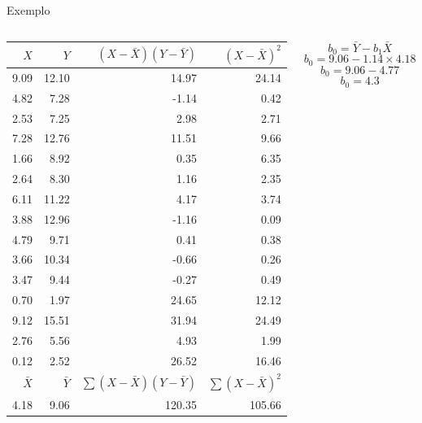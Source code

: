 \documentclass{beamer}\usepackage[]{graphicx}\usepackage[]{color}
\begin{document}
\begin{frame}{Exemplo}

\begin{columns}[c]


\begin{tiny}
\begin{table}[ht]
\centering
\begin{tabular}{rrrr}
  \hline
  $X$ & $Y$ & $(X - \bar X)(Y - \bar Y)$ & $(X - \bar X)^2$ \\ 
  \hline
  9.09 & 12.10 & 14.97 & 24.14 \\ 
  4.82 & 7.28 & -1.14 & 0.42 \\ 
  2.53 & 7.25 & 2.98 & 2.71 \\ 
  7.28 & 12.76 & 11.51 & 9.66 \\ 
  1.66 & 8.92 & 0.35 & 6.35 \\ 
  2.64 & 8.30 & 1.16 & 2.35 \\ 
  6.11 & 11.22 & 4.17 & 3.74 \\ 
  3.88 & 12.96 & -1.16 & 0.09 \\ 
  4.79 & 9.71 & 0.41 & 0.38 \\ 
  3.66 & 10.34 & -0.66 & 0.26 \\ 
  3.47 & 9.44 & -0.27 & 0.49 \\ 
  0.70 & 1.97 & 24.65 & 12.12 \\ 
  9.12 & 15.51 & 31.94 & 24.49 \\ 
  2.76 & 5.56 & 4.93 & 1.99 \\ 
  0.12 & 2.52 & 26.52 & 16.46 \\ 
   \hline
  $\bar X$ & $\bar Y$ & $\sum(X - \bar X)(Y - \bar Y)$ & $\sum(X - \bar X)^2$\\
  \hline
  4.18 & 9.06 & 120.35 &  105.66 \\
  \hline
\end{tabular}
\end{table}
\end{tiny}


\begin{equation*}
b_0 = \bar Y - b_1 \bar X
\end{equation*} \pause
\vfill
\begin{equation*}
b_0 = 9.06 - 1.14 \times 4.18
\end{equation*}  \pause
\vfill
\begin{equation*}
b_0 = 9.06 - 4.77
\end{equation*}  \pause 
\vfill
\begin{equation*}
b_0 = 4.3
\end{equation*} 
\vfill
\end{columns}  


\end{frame}
\end{document}

